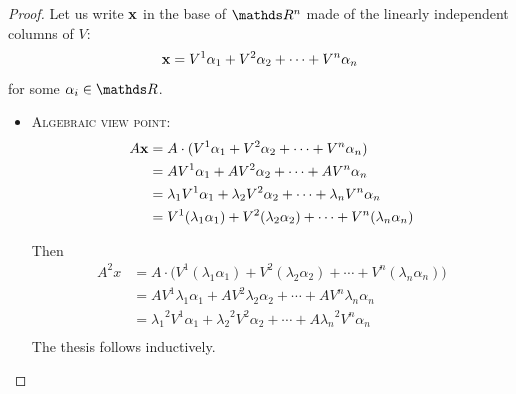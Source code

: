 \documentclass[computationalMathematics.tex]{subfiles}
\begin{document}
\begin{proof}
  Let us write ${\bf x }$ in the base of $\R^n$ made of the linearly independent columns of $V$:
  \[
		{\bf x } = V^1 \alpha_1 + V^2 \alpha_2 + \cdots + V^n \alpha_n
  \]
  for some $\alpha_i \in \R$.

 \begin{itemize}
   \item \textsc{Algebraic view point:}
  \begin{equation}
    \begin{split}
      A{\bf x } &= A \cdot ( V^1 \alpha_1 + V^2 \alpha_2 + \cdots + V^n \alpha_n)\\
      &= A V^1 \alpha_1 + A V^2 \alpha_2 + \cdots + A V^n \alpha_n\\
      & = \lambda_1 V^1 \alpha_1 + \lambda_2 V^2 \alpha_2 + \cdots + \lambda_n V^n \alpha_n\\
      &= V^1 (\lambda_1 \alpha_1) + V^2 (\lambda_2 \alpha_2) + \cdots + V^n (\lambda_n \alpha_n)\\
    \end{split}
  \end{equation}

  Then
 \begin{equation}
    \begin{split}
      A^2 x &= A \cdot \Big (V^1 (\lambda_1 \alpha_1) + V^2 (\lambda_2 \alpha_2) + \cdots + V^n (\lambda_n \alpha_n) \Big )\\
      &= A V^1 \lambda_1 \alpha_1 + A V^2 \lambda_2 \alpha_2 + \cdots + A V^n \lambda_n \alpha_n\\
      &= {\lambda_1}^2 V^1 \alpha_1 + {\lambda_2}^2 V^2 \alpha_2 + \cdots + A {\lambda_n}^2 V^n \alpha_n\\
    \end{split}
  \end{equation}
The thesis follows inductively.
  

\end{itemize}
\end{proof}
\end{document}
